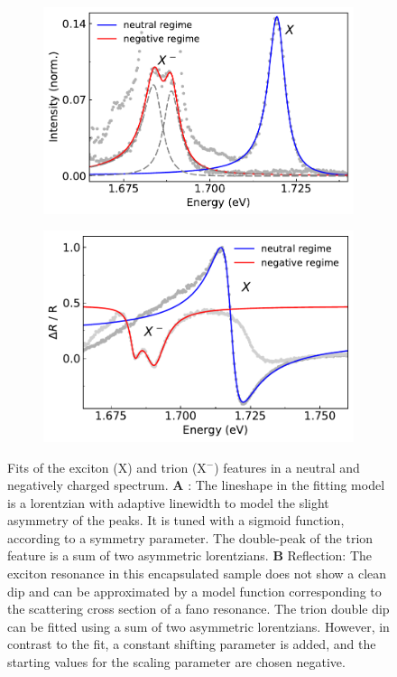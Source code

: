\begin{figure}[t]
	\begin{subfigure}{0.49\textwidth}
		\caption{}
		\includegraphics[height=0.65\textwidth]{X_Trion_fit}
	\end{subfigure}
	\begin{subfigure}{0.49\textwidth}
		\caption{}
		\includegraphics[height=0.65\textwidth]{RF_neut_neg}
	\end{subfigure}
	\caption{Fits of the exciton (X) and trion (X$^-$) features in a neutral and negatively charged spectrum. \textbf{A} \pl : The lineshape in the fitting model is a lorentzian with adaptive linewidth to model the slight asymmetry of the peaks. It is tuned with a sigmoid function, according to a symmetry parameter. The double-peak of the trion feature is a sum of two asymmetric lorentzians. \textbf{B} Reflection: The exciton resonance in this \hbng encapsulated sample does not show a clean dip and can be approximated by a model function corresponding to the scattering cross section of a fano resonance. The trion double dip can be fitted using a sum of two asymmetric lorentzians. However, in contrast to the \pl fit, a constant shifting parameter is added, and the starting values for the scaling parameter are chosen negative.}\label{linefits}
\end{figure}


